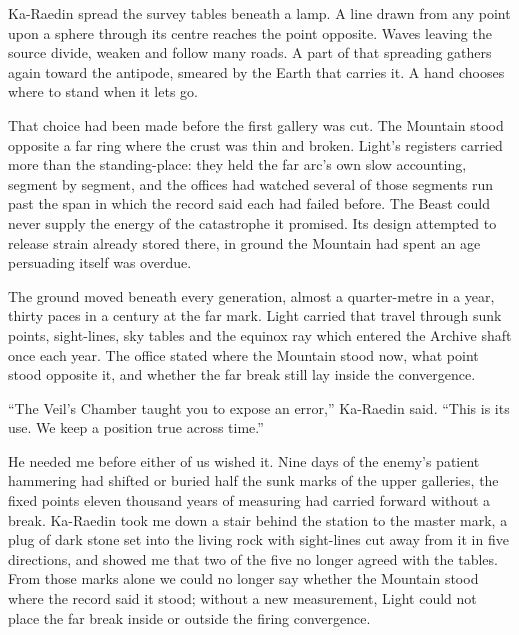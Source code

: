 \ornament

Ka-Raedin spread the survey tables beneath a lamp. A line drawn from any point upon a sphere through its centre reaches the point opposite. Waves leaving the source divide, weaken and follow many roads. A part of that spreading gathers again toward the antipode, smeared by the Earth that carries it. A hand chooses where to stand when it lets go.\par

That choice had been made before the first gallery was cut. The Mountain stood opposite a far ring where the crust was thin and broken. Light's registers carried more than the standing-place: they held the far arc's own slow accounting, segment by segment, and the offices had watched several of those segments run past the span in which the record said each had failed before. The Beast could never supply the energy of the catastrophe it promised. Its design attempted to release strain already stored there, in ground the Mountain had spent an age persuading itself was overdue.\par

The ground moved beneath every generation, almost a quarter-metre in a year, thirty paces in a century at the far mark. Light carried that travel through sunk points, sight-lines, sky tables and the equinox ray which entered the Archive shaft once each year. The office stated where the Mountain stood now, what point stood opposite it, and whether the far break still lay inside the convergence.\par

``The Veil's Chamber taught you to expose an error,'' Ka-Raedin said. ``This is its use. We keep a position true across time.''\par

He needed me before either of us wished it. Nine days of the enemy's patient hammering had shifted or buried half the sunk marks of the upper galleries, the fixed points eleven thousand years of measuring had carried forward without a break. Ka-Raedin took me down a stair behind the station to the master mark, a plug of dark stone set into the living rock with sight-lines cut away from it in five directions, and showed me that two of the five no longer agreed with the tables. From those marks alone we could no longer say whether the Mountain stood where the record said it stood; without a new measurement, Light could not place the far break inside or outside the firing convergence.\par

